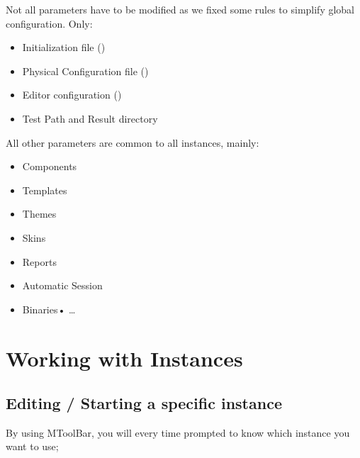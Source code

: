\documentclass[letterpaper,10pt,english]{jupyterBook}
\begin{document}
\sphinxAtStartPar
{}

\sphinxAtStartPar
Not all parameters have to be modified as we fixed some rules to simplify global configuration. Only:
\begin{itemize}
\item {} 
\sphinxAtStartPar
Initialization file ()

\item {} 
\sphinxAtStartPar
Physical Configuration file ()

\item {} 
\sphinxAtStartPar
Editor configuration ()

\item {} 
\sphinxAtStartPar
Test Path and Result directory

\end{itemize}

\sphinxAtStartPar
All other parameters are common to all instances, mainly:
\begin{itemize}
\item {} 
\sphinxAtStartPar
Components

\item {} 
\sphinxAtStartPar
Templates

\item {} 
\sphinxAtStartPar
Themes

\item {} 
\sphinxAtStartPar
Skins

\item {} 
\sphinxAtStartPar
Reports

\item {} 
\sphinxAtStartPar
Automatic Session

\item {} 
\sphinxAtStartPar
Binaries•	…

\end{itemize}


\section{Working with Instances}
\label{\detokenize{02_Multi-Instance:working-with-instances}}

\subsection{Editing / Starting a specific instance}
\label{\detokenize{02_Multi-Instance:editing-starting-a-specific-instance}}
\sphinxAtStartPar
By using MToolBar, you will every time prompted to know which instance you want to use;
\end{document}
